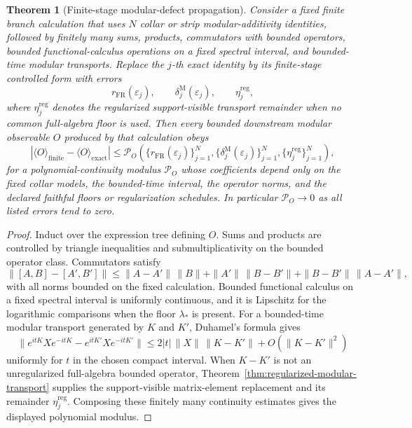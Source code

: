 \documentclass[11pt]{article}
\newtheorem{theorem}{Theorem}[section]
\begin{document}
\begin{theorem}[Finite-stage modular-defect propagation]\label{thm:modular-defect-propagation}
Consider a fixed finite branch calculation that uses \(N\) collar or strip
modular-additivity identities, followed by finitely many sums, products,
commutators with bounded operators, bounded functional-calculus operations on
a fixed spectral interval, and bounded-time modular transports. Replace the
\(j\)-th exact identity by its finite-stage controlled form with errors
\[
r_{\mathrm{FR}}(\varepsilon_j),\qquad
\delta^{\mathrm M}_j(\varepsilon_j),\qquad
\eta^{\mathrm{reg}}_j,
\]
where \(\eta^{\mathrm{reg}}_j\) denotes the regularized support-visible
transport remainder when no common full-algebra floor is used. Then every
bounded downstream modular observable \(O\) produced by that calculation obeys
\[
\left|
\langle O\rangle_{\mathrm{finite}}
-
\langle O\rangle_{\mathrm{exact}}
\right|
\le
\mathcal P_O\!\left(
\{r_{\mathrm{FR}}(\varepsilon_j)\}_{j=1}^N,
\{\delta^{\mathrm M}_j(\varepsilon_j)\}_{j=1}^N,
\{\eta^{\mathrm{reg}}_j\}_{j=1}^N
\right),
\]
for a polynomial-continuity modulus \(\mathcal P_O\) whose coefficients depend
only on the fixed collar models, the bounded-time interval, the operator norms,
and the declared faithful floors or regularization schedules. In particular
\(\mathcal P_O\to0\) as all listed errors tend to zero.
\end{theorem}

\begin{proof}
Induct over the expression tree defining \(O\). Sums and products are
controlled by triangle inequalities and submultiplicativity on the bounded
operator class. Commutators satisfy
\[
\|[A,B]-[A',B']\|
\le
\|A-A'\|\,\|B\|+\|A'\|\,\|B-B'\|
+\|B-B'\|\,\|A-A'\|,
\]
with all norms bounded on the fixed calculation. Bounded functional calculus
on a fixed spectral interval is uniformly continuous, and it is Lipschitz for
the logarithmic comparisons when the floor \(\lambda_\ast\) is present. For a
bounded-time modular transport generated by \(K\) and \(K'\), Duhamel's formula
gives
\[
\|e^{itK}Xe^{-itK}-e^{itK'}Xe^{-itK'}\|
\le
2|t|\,\|X\|\,\|K-K'\|+O(\|K-K'\|^2)
\]
uniformly for \(t\) in the chosen compact interval. When \(K-K'\) is not an
unregularized full-algebra bounded operator, Theorem~\ref{thm:regularized-modular-transport}
supplies the support-visible matrix-element replacement and its remainder
\(\eta^{\mathrm{reg}}_j\). Composing these finitely many continuity estimates
gives the displayed polynomial modulus.
\end{proof}
\end{document}
